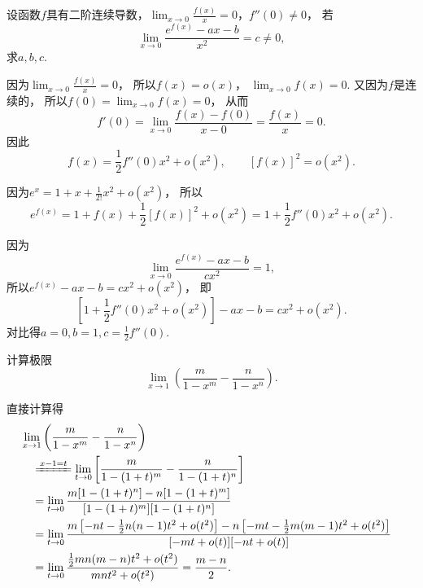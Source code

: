 \begin{example}
设函数\(f\)具有二阶连续导数，\(\lim_{x\to0} \frac{f(x)}{x} = 0\)，\(f''(0)\neq0\)，
若\[
	\lim_{x\to0} \frac{e^{f(x)}-ax-b}{x^2} = c \neq 0,
\]
求\(a,b,c\).
\begin{solution}
因为\(\lim_{x\to0} \frac{f(x)}{x} = 0\)，
所以\(f(x) = o(x)\)，
\(\lim_{x\to0} f(x) = 0\).
又因为\(f\)是连续的，
所以\(f(0) = \lim_{x\to0} f(x) = 0\)，
从而\[
	f'(0) = \lim_{x\to0} \frac{f(x) - f(0)}{x - 0} = \frac{f(x)}{x} = 0.
\]
因此\[
	f(x) = \frac12 f''(0) x^2 + o(x^2),
	\qquad
	[f(x)]^2 = o(x^2).
\]

因为\(e^x = 1 + x + \frac{1}{2!} x^2 + o(x^2)\)，
所以\[
	e^{f(x)} = 1 + f(x) + \frac{1}{2} [f(x)]^2 + o(x^2)
	= 1 + \frac{1}{2} f''(0) x^2 + o(x^2).
\]

因为\[
	\lim_{x\to0} \frac{e^{f(x)} - ax - b}{c x^2} = 1,
\]
所以\(e^{f(x)} - ax - b = c x^2 + o(x^2)\)，
即\[
	\left[ 1 + \frac{1}{2} f''(0) x^2 + o(x^2) \right] - ax - b = c x^2 + o(x^2).
\]
对比得\(a = 0, b = 1, c = \frac{1}{2} f''(0)\).
\end{solution}
\end{example}

\begin{example}
计算极限\[
	\lim_{x\to1} \left(\frac{m}{1-x^m} - \frac{n}{1-x^n}\right).
\]
\begin{solution}
直接计算得
\begin{align*}
	&\hspace{-10pt}
	\lim_{x\to1} \left(\frac{m}{1-x^m} - \frac{n}{1-x^n}\right) \\
	&\xlongequal{x-1=t}
	\lim_{t\to0} \left[\frac{m}{1-(1+t)^m}-\frac{n}{1-(1+t)^n}\right] \\
	&=
	\lim_{t\to0} \frac{m[1-(1+t)^n]-n[1-(1+t)^m]}{[1-(1+t)^m][1-(1+t)^n]} \\
	&=
	\lim_{t\to0} \frac{m\left[-nt-\frac{1}{2}n(n-1)t^2+o(t^2)\right]
		-n\left[-mt-\frac{1}{2}m(m-1)t^2+o(t^2)\right]}{[-mt+o(t)][-nt+o(t)]} \\
	&=
	\lim_{t\to0} \frac{\frac{1}{2}mn(m-n)t^2+o(t^2)}{mnt^2+o(t^2)}
	= \frac{m-n}{2}.
\end{align*}
\end{solution}
\end{example}

